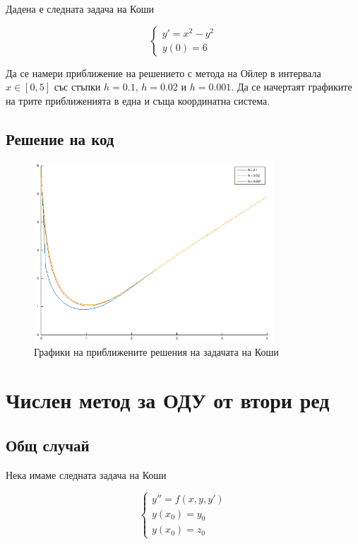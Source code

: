 \documentclass{scrartcl}
\begin{document}
Дадена е следната задача на Коши

$$
\begin{cases}
y' = x^2 - y^2\\
y(0) = 6
\end{cases}
$$

Да се намери приближение на решението с метода на Ойлер в интервала $x\in [0, 5]$ със стъпки $h = 0.1$, $h = 0.02$ и $h = 0.001$. Да се начертаят графиките на трите приближенията в една и съща координатна система.

\subsection{Решение на код}



\begin{figure}[H]
    \centering
    \includegraphics[width=0.8\textwidth]{euler_picture.png}
    \caption{Графики на приближените решения на задачата на Коши}
    \label{fig:euler_picture}
\end{figure}

\section{Числен метод за ОДУ от втори ред}

\subsection{Общ случай}

Нека имаме следната задача на Коши

$$
\begin{cases}
y'' = f(x, y, y')\\
y(x_0) = y_0\\
y(x_0) = z_0
\end{cases}
$$
\end{document}
